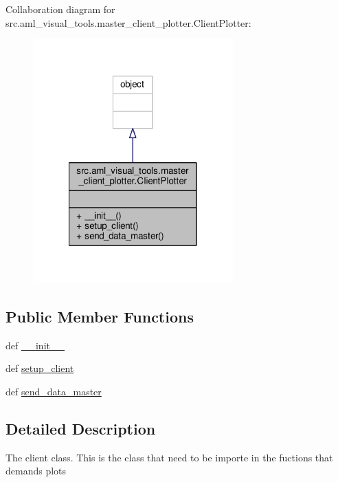 Collaboration diagram for src.\-aml\-\_\-visual\-\_\-tools.\-master\-\_\-client\-\_\-plotter.\-Client\-Plotter\-:
\nopagebreak
\begin{figure}[H]
\begin{center}
\leavevmode
\includegraphics[width=218pt]{classsrc_1_1aml__visual__tools_1_1master__client__plotter_1_1_client_plotter__coll__graph}
\end{center}
\end{figure}
\subsection*{Public Member Functions}
\begin{DoxyCompactItemize}
\item 
def \hyperlink{classsrc_1_1aml__visual__tools_1_1master__client__plotter_1_1_client_plotter_a96dd59ca5b4b85bc1ab44e0b443ad14a}{\-\_\-\-\_\-init\-\_\-\-\_\-}
\item 
def \hyperlink{classsrc_1_1aml__visual__tools_1_1master__client__plotter_1_1_client_plotter_ad2d1cb31335b31b06afdd09ebd8d3fae}{setup\-\_\-client}
\item 
def \hyperlink{classsrc_1_1aml__visual__tools_1_1master__client__plotter_1_1_client_plotter_ae64a9d9aefd20da34d97d07c265ce056}{send\-\_\-data\-\_\-master}
\end{DoxyCompactItemize}


\subsection{Detailed Description}
\begin{DoxyVerb}The client class. This is the class
that need to be importe in the fuctions that
demands plots
\end{DoxyVerb}
 


